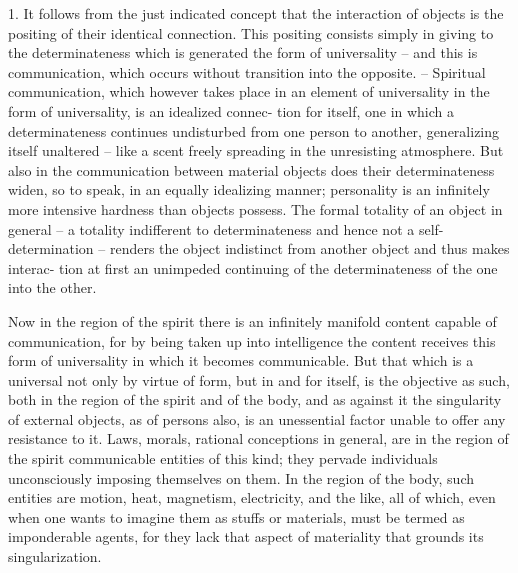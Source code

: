 1. It follows from the just indicated concept that the interaction of objects
is the positing of their identical connection. This positing consists simply in
giving to the determinateness which is generated the form of universality –
and this is communication, which occurs without transition into the
opposite. – Spiritual communication, which however takes place in an
element of universality in the form of universality, is an idealized connec-
tion for itself, one in which a determinateness continues undisturbed from
one person to another, generalizing itself unaltered – like a scent freely
spreading in the unresisting atmosphere. But also in the communication
between material objects does their determinateness widen, so to speak,
in an equally idealizing manner; personality is an infinitely more intensive
hardness than objects possess. The formal totality of an object in general – a
totality indifferent to determinateness and hence not a self-determination –
renders the object indistinct from another object and thus makes interac-
tion at first an unimpeded continuing of the determinateness of the one
into the other.

Now in the region of the spirit there is
an infinitely manifold content capable of communication,
for by being taken up into intelligence the content receives
this form of universality in which it becomes communicable.
But that which is a universal not only by virtue of form,
but in and for itself, is the objective as such, both in the region of the spirit and of
the body, and as against it the singularity of external objects, as of persons
also, is an unessential factor unable to offer any resistance to it.
Laws, morals, rational conceptions in general, are in the region of
the spirit communicable entities of this kind;
they pervade individuals unconsciously imposing themselves on them.
In the region of the body, such entities are motion, heat,
magnetism, electricity, and the like,
all of which, even when one wants to imagine
them as stuffs or materials,
must be termed as imponderable agents,
for they lack that aspect of materiality
that grounds its singularization.

